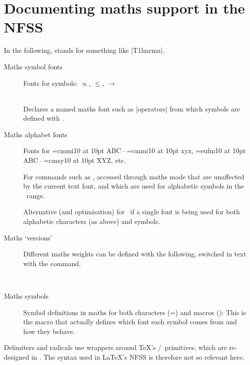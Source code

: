 
\section{Documenting maths support in the NFSS}

In the following,  stands for something like |{T1}{lmr}{m}{n}|.

\begin{description}
\item[Maths symbol fonts] Fonts for symbols: $\propto$, $\leq$, $\rightarrow$

\cmd\DeclareSymbolFont{}\\
Declares a named maths font such as |operators| from which symbols are defined with \cmd\DeclareMathSymbol.

\item[Maths alphabet fonts] Fonts for {\font\1=cmmi10 at 10pt\1 ABC}\,–\,{\font\1=cmmi10 at 10pt\1 xyz}, {\font\1=eufm10 at 10pt\1 ABC}\,–\,{\font\1=cmsy10 at 10pt\1 XYZ}, etc.

\cmd\DeclareMathAlphabet{}

For commands such as \cmd\mathbf, accessed
through maths mode that are unaffected by the current text font, and which are used for
alphabetic symbols in the \ascii\ range.

\cmd\DeclareSymbolFontAlphabet{}

Alternative (and optimisation) for \cmd\DeclareMathAlphabet\ if a single font is being used
for both alphabetic characters (as above) and symbols.

\item[Maths `versions'] Different maths weights can be defined with the following, switched
in text with the \cmd\mathversion{} command.

\cmd\SetSymbolFont{}\\
\cmd\SetMathAlphabet{}

\item[Maths symbols] Symbol definitions in maths for both characters (=) and macros (\cmd\eqdef):
\cmd\DeclareMathSymbol{}
This is the macro that actually defines which font each symbol comes from and how they behave.
\end{description}
Delimiters and radicals use wrappers around \TeX's \cmd\delimiter/\cmd\radical\ primitives,
which are re-designed in \XeTeX. The syntax used in \LaTeX's NFSS is therefore not so relevant here.
